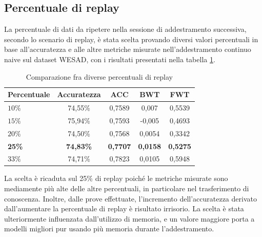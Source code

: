 \subsection{Percentuale di replay}
La percentuale di dati da ripetere nella sessione di addestramento successiva, secondo lo scenario di replay, è stata scelta provando diversi valori percentuali in base all'accuratezza e alle altre metriche misurate nell'addestramento continuo naive sul dataset WESAD, con i risultati presentati nella tabella \ref{tab:replayperctest}.\\
\begin{table}[h]
    \begin{center}
        \begin{tabular}{l|c|c|c|c}
            \textbf{Percentuale} & \textbf{Accuratezza} & \textbf{ACC} & \textbf{BWT} & \textbf{FWT}\\
            \hline
            $10\%$ & 74,55\% & 0,7589 & 0,007 & 0,5539\\
            $15\%$ & 75,94\% & 0,7593 & -0,005 & 0,4693\\
            $20\%$ & 74,50\% & 0,7568 & 0,0054 & 0,3342\\
            \textbf{25\%} & \textbf{74,83\%} & \textbf{0,7707} & \textbf{0,0158} & \textbf{0,5275}\\
            $33\%$ & 74,71\% & 0,7823 & 0,0105 & 0,5948\\
        \end{tabular}
        \caption{Comparazione fra diverse percentuali di replay}
        \label{tab:replayperctest}
    \end{center}
\end{table}
La scelta è ricaduta sul 25\% di replay poiché le metriche misurate sono mediamente più alte delle altre percentuali, in particolare nel trasferimento di conoscenza. Inoltre, dalle prove effettuate, l'incremento dell'accuratezza derivato dall'aumentare la percentuale di replay è risultato irrisorio. La scelta è stata ulteriormente influenzata dall'utilizzo di memoria, e un valore maggiore porta a modelli migliori pur usando più memoria durante l'addestramento.
